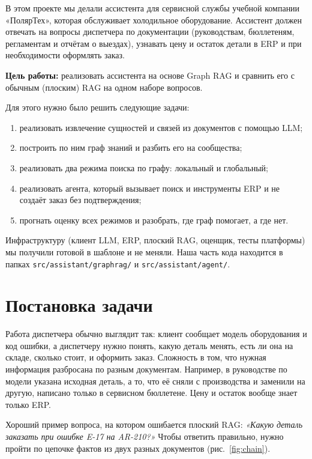 \documentclass[a4paper,12pt]{article}
\newcommand{\code}[1]{\texttt{#1}}
\begin{document}
В этом проекте мы делали ассистента для сервисной службы учебной компании «ПолярТех», которая обслуживает холодильное оборудование. Ассистент должен отвечать на вопросы диспетчера по документации (руководствам, бюллетеням, регламентам и отчётам о выездах), узнавать цену и остаток детали в ERP и при необходимости оформлять заказ.

\textbf{Цель работы:} реализовать ассистента на основе Graph RAG и сравнить его с обычным (плоским) RAG на одном наборе вопросов.

Для этого нужно было решить следующие задачи:
\begin{enumerate}
\item реализовать извлечение сущностей и связей из документов с помощью LLM;
\item построить по ним граф знаний и разбить его на сообщества;
\item реализовать два режима поиска по графу: локальный и глобальный;
\item реализовать агента, который вызывает поиск и инструменты ERP и не создаёт заказ без подтверждения;
\item прогнать оценку всех режимов и разобрать, где граф помогает, а где нет.
\end{enumerate}

Инфраструктуру (клиент LLM, ERP, плоский RAG, оценщик, тесты платформы) мы получили готовой в шаблоне и не меняли. Наша часть кода находится в папках \code{src/assistant/graphrag/} и \code{src/assistant/agent/}.

\section{Постановка задачи}

Работа диспетчера обычно выглядит так: клиент сообщает модель оборудования и код ошибки, а диспетчеру нужно понять, какую деталь менять, есть ли она на складе, сколько стоит, и оформить заказ. Сложность в том, что нужная информация разбросана по разным документам. Например, в руководстве по модели указана исходная деталь, а то, что её сняли с производства и заменили на другую, написано только в сервисном бюллетене. Цену и остаток вообще знает только ERP.

Хороший пример вопроса, на котором ошибается плоский RAG: \emph{«Какую деталь заказать при ошибке E-17 на AR-210?»} Чтобы ответить правильно, нужно пройти по цепочке фактов из двух разных документов (рис.~\ref{fig:chain}).
\end{document}
